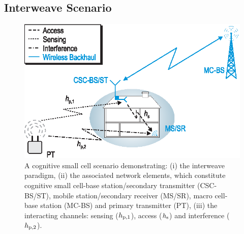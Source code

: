 \subsection{Interweave Scenario}

\begin{figure}[!ht]
\centering
\includegraphics[width = \figscale]{figures/CR_Scenario_Interweave}
\caption{A cognitive small cell scenario demonstrating: (i) the interweave paradigm, (ii) the associated network elements, which constitute cognitive small cell-base station/secondary transmitter (CSC-BS/ST), mobile station/secondary receiver (MS/SR), macro cell-base station (MC-BS) and primary transmitter (PT), (iii) the interacting channels: sensing ($h_{\text{p,1}}$), access ($h_{\text{s}}$) and interference ($h_{\text{p,2}}$).} 
\label{fig_IS:scenario}
\end{figure}
